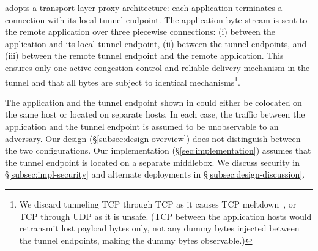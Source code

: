
{\sys} adopts a transport-layer proxy architecture: each application
terminates a connection with its local tunnel endpoint. The application byte
stream is sent to the remote application over three piecewise connections: (i)
between the application and its local tunnel endpoint, (ii) between the
tunnel endpoints, and (iii) between the remote tunnel endpoint and the remote
application.
This ensures only one active congestion control and reliable delivery mechanism
in the tunnel and that all bytes are subject to identical mechanisms\footnote{
We discard tunneling TCP through TCP as it causes TCP
meltdown~\cite{honda2005tcpovertcp, tcp-meltdown}, or TCP through UDP as it is
unsafe.
(TCP between the application hosts would retransmit lost payload bytes
only, not any dummy bytes injected between the tunnel endpoints, making the
dummy bytes observable.)
}.


The application and the tunnel endpoint shown in 
could either be colocated on the same host or located on separate hosts.
In each case, the traffic between the application and the tunnel endpoint is
assumed to be unobservable to an adversary.
Our design (\S\ref{subsec:design-overview}) does not distinguish between the two
configurations.
Our implementation (\S\ref{sec:implementation}) assumes that the tunnel endpoint
is located on a separate middlebox. We discuss security in
\S\ref{subsec:impl-security} and alternate deployments in
\S\ref{subsec:design-discussion}.

